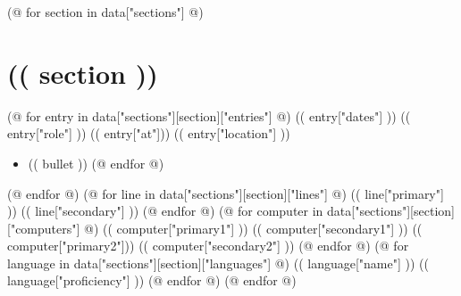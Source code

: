 \documentclass[10pt,color,letterpaper,sans]{moderncv}
\begin{document}
\maketitle

(@ for section in data["sections"] @)
  \section{(( section ))}
  (@ for entry in data["sections"][section]["entries"] @)
    \cventry
      {(( entry["dates"] ))}
      {(( entry["role"] ))}
      {(( entry["at"])) }
      {(( entry["location"] ))}
      {}
      {
        \begin{itemize}
        (@ for bullet in entry["bullets"] @) \item (( bullet )) (@ endfor @)
        \end{itemize}
      }
  (@ endfor @)
  (@ for line in data["sections"][section]["lines"] @)
    \cvline
      {(( line["primary"] ))}
      {(( line["secondary"] ))}
  (@ endfor @)
  (@ for computer in data["sections"][section]["computers"] @)
    \cvcomputer
      {(( computer["primary1"] ))}
      {(( computer["secondary1"] ))}
      {(( computer["primary2"])) }
      {(( computer["secondary2"] ))}
  (@ endfor @)
  (@ for language in data["sections"][section]["languages"] @)
    \cvlanguage
      {(( language["name"] ))}
      {(( language["proficiency"] ))}
      {}
  (@ endfor @)
(@ endfor @)
\end{document}
